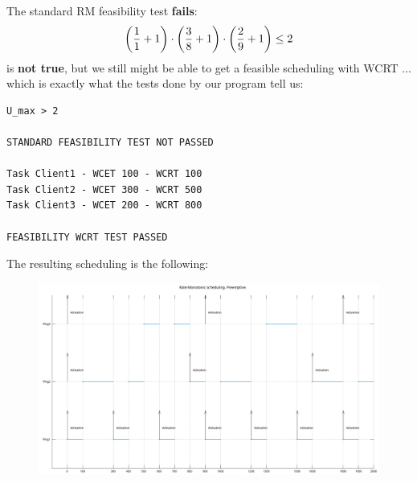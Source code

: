 \documentclass[10pt]{article}
\begin{document}
The standard RM feasibility test \textbf{fails}:
\[\bigg{(}\frac{1}{1}+1\bigg{)}\cdot\bigg{(}\frac{3}{8}+1\bigg)\cdot\bigg(\frac{2}{9}+1\bigg)\leq2\] is \textbf{not true}, but we still might be able to get a feasible scheduling with WCRT ... which is exactly what the tests done by our program tell us:

\begin{lstlisting}
U_max > 2

STANDARD FEASIBILITY TEST NOT PASSED

Task Client1 - WCET 100 - WCRT 100
Task Client2 - WCET 300 - WCRT 500
Task Client3 - WCET 200 - WCRT 800

FEASIBILITY WCRT TEST PASSED
\end{lstlisting}

The resulting scheduling is the following:

\begin{figure}[H]
    \centering
    \includegraphics[width=1.0\linewidth]{Pictures/wcrt_gantt_1302.png}
    \caption{}
    \label{fig:13}
\end{figure}

\newpage

\printbibliography{}
\end{document}
